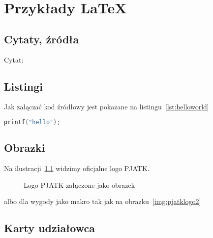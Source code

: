 
\chapter{Przykłady LaTeX}
\label{ch:przykady-latex}

\section{Cytaty, źródła}
\label{sec:cytaty-zroda}
Cytat: \cite{bla}

\section{Listingi}
\label{sec:listingi}
Jak załączać kod źródłowy jest pokazane na listingu~\ref{lst:helloworld}

\begin{lstlisting}[language=c,caption={Przykładowy witaj w świecie}, label={lst:helloworld}]
printf("hello");
\end{lstlisting}

\section{Obrazki}
\label{sec:obrazki}

Na ilustracji~\ref{fig:pjatklogo} widzimy oficjalne logo PJATK\@.

\begin{figure}[h]
    \centering
    \caption{Logo PJATK załączone jako obrazek}
    \label{fig:pjatklogo}
\end{figure}

albo dla wygody jako makro tak jak na obrazku~\ref{img:pjatklogo2}


\section{Karty udziałowca}
\label{sec:karty-udziaowca}

\begin{stakeholder}[label={tab:stakeholder:someholder},caption={Przykładowy opis udzialowca}]
\end{stakeholder}

